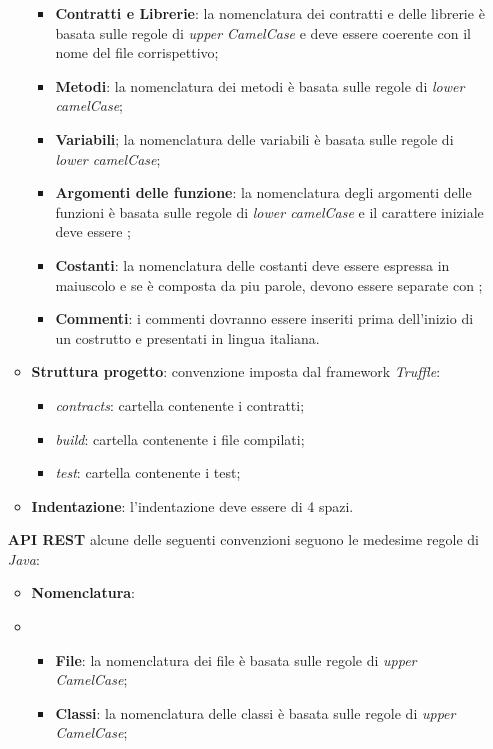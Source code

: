 \begin{itemize}
\begin{itemize}
\begin{itemize}
            \item \textbf{Contratti e Librerie}: la nomenclatura dei contratti e delle librerie è basata sulle regole di \textit{upper CamelCase} e deve essere coerente con il nome del file corrispettivo;
            \item \textbf{Metodi}: la nomenclatura dei metodi è basata sulle regole di \textit{lower camelCase};
            \item \textbf{Variabili}; la nomenclatura delle variabili è basata sulle regole di \textit{lower camelCase};
            \item \textbf{Argomenti delle funzione}: la nomenclatura degli argomenti delle funzioni è basata sulle regole di \textit{lower camelCase} e il carattere iniziale deve essere \textit{\textunderscore};
            \item \textbf{Costanti}: la nomenclatura delle costanti deve essere espressa in maiuscolo e se è composta da piu parole, devono essere separate con \textit{\textunderscore};
            \item \textbf{Commenti}: i commenti dovranno essere inseriti prima dell’inizio di un  costrutto e presentati in lingua italiana.
        \end{itemize}
        \item \textbf{Struttura progetto}: convenzione imposta dal framework \textit{Truffle}:
        \begin{itemize}
            \item \textit{contracts}: cartella contenente i contratti;
            \item \textit{build}: cartella contenente i file compilati;
            \item \textit{test}: cartella contenente i test;
        \end{itemize}
        \item \textbf{Indentazione}: l'indentazione deve essere di 4 spazi.
    \end{itemize}
    \textbf{API REST} alcune delle seguenti convenzioni seguono le medesime regole di \textit{Java}:
    \begin{itemize}
        \item \textbf{Nomenclatura}:
        \item \begin{itemize}
            \item \textbf{File}: la nomenclatura dei file è basata sulle regole di \textit{upper CamelCase};
            \item \textbf{Classi}: la nomenclatura delle classi è basata sulle regole di \textit{upper CamelCase};

\end{itemize}
\end{itemize}
\end{itemize}
